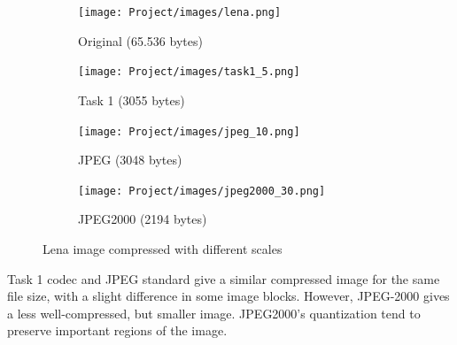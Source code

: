 \documentclass{article}
\begin{document}
\begin{figure}[H]
  \centering
  
  \begin{subfigure}{0.45\textwidth}
    \centering
    \texttt{[image: Project/images/lena.png]}
    \caption{Original (65.536 bytes)}
    \label{fig:subfig11}
  \end{subfigure}
  \hfill
  \begin{subfigure}{0.45\textwidth}
    \centering
    \texttt{[image: Project/images/task1\_5.png]}
    \caption{Task 1 (3055 bytes)}
    \label{fig:subfig22}
  \end{subfigure}
  
  \vspace{1em}
  
  \begin{subfigure}{0.45\textwidth}
    \centering
    \texttt{[image: Project/images/jpeg\_10.png]}
    \caption{JPEG (3048 bytes)}
    \label{fig:subfig33}
  \end{subfigure}
  \hfill
  \begin{subfigure}{0.45\textwidth}
    \centering
    \texttt{[image: Project/images/jpeg2000\_30.png]}
    \caption{JPEG2000 (2194 bytes)}
    \label{fig:subfig44}
  \end{subfigure}
  
  \caption{Lena image compressed with different scales}
  \label{fig:subplots2}
\end{figure}

Task 1 codec and JPEG standard give a similar compressed image for the same file size, with a slight difference in some image blocks. However, JPEG-2000 gives a less well-compressed, but smaller image. JPEG2000's quantization tend to preserve important regions of the image.
\end{document}
